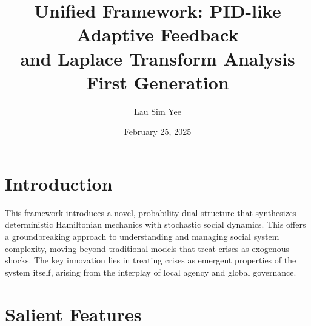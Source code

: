 \documentclass{article}
\title{Unified Framework: PID-like Adaptive Feedback \\ and Laplace Transform Analysis \\ First Generation}
\author{Lau Sim Yee}
\date{February 25, 2025}
\theoremstyle{definition}
\begin{document}
\maketitle

\section*{Introduction}

This framework introduces a novel, probability-dual structure that synthesizes deterministic Hamiltonian mechanics with stochastic social dynamics. This offers a groundbreaking approach to understanding and managing social system complexity, moving beyond traditional models that treat crises as exogenous shocks.  The key innovation lies in treating crises as emergent properties of the system itself, arising from the interplay of local agency and global governance.

\section*{Salient Features} %
\end{document}
